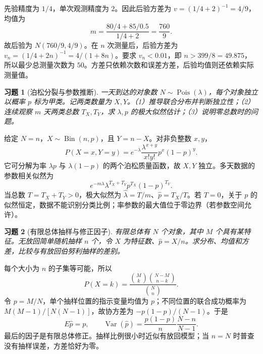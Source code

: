 \documentclass[UTF8,12pt,a4paper,fontset=fandol]{ctexart}
\newtheorem{exercise}{习题}[section]
\begin{document}
\begin{solve}\label{a:M-PF-31}先验精度为 $1/4$，单次观测精度为 $2$。因此后验方差为 $v=(1/4+2)^{-1}=4/9$，均值为\[m=\frac{80/4+85/0.5}{1/4+2}=\frac{760}{9}.\]故后验为 $N(760/9,4/9)$。在 $n$ 次测量后，后验方差为 $v_n=(1/4+2n)^{-1}=4/(1+8n)$。要求 $v_n<0.01$，即 $n>399/8=49.875$，所以最少总测量次数为 $50$。方差只依赖次数和误差方差，后验均值则还依赖实际测量值。\end{solve}

\begin{exercise}[泊松分裂与参数推断]\label{q:B17.1}
一天到达的对象数 $N\sim\operatorname{Pois}(\lambda)$，每个对象独立以概率 $p$ 标为甲类。记两类数量为 $X,Y$。（1）推导联合分布并判断独立性；（2）连续观察 $m$ 天两类总数 $T_X,T_Y$，求 $\lambda,p$ 的极大似然估计；（3）说明零总数时的问题。\par{}
\end{exercise}

\begin{solve}\label{a:B17.1}给定 $N=n$，$X\sim\operatorname{Bin}(n,p)$，且 $Y=n-X$。对非负整数 $x,y$，\[P(X=x,Y=y)=e^{-\lambda}\frac{\lambda^{x+y}}{x!y!}p^x(1-p)^y.\]它可分解为率 $\lambda p$ 与 $\lambda(1-p)$ 的两个泊松质量函数，故 $X,Y$ 独立。多天数据的参数相关似然为\[e^{-m\lambda}\lambda^{T_X+T_Y}p^{T_X}(1-p)^{T_Y}.\]当总数 $T=T_X+T_Y>0$，极大似然为 $\widehat\lambda=T/m$、$\widehat p=T_X/T$。若 $T=0$，关于 $p$ 的似然恒定，数据不能识别分类比例；率参数的最大值位于零边界（若参数空间允许）。\end{solve}

\begin{exercise}[有限总体抽样与修正因子]\label{q:B17.2}
有限总体有 $N$ 个对象，其中 $M$ 个具有某特征。无放回简单随机抽样 $n$ 个，令 $X$ 为特征数、$\widehat p=X/n$。求分布、均值和方差，比较与有放回伯努利抽样的差别。\par{}
\end{exercise}

\begin{solve}\label{a:B17.2}每个大小为 $n$ 的子集等可能，所以\[P(X=k)=\frac{\binom Mk\binom{N-M}{n-k}}{\binom Nn}.\]令 $p=M/N$，单个抽样位置的指示变量均值为 $p$；不同位置的联合成功概率为 $M(M-1)/[N(N-1)]$，故协方差为 $-p(1-p)/(N-1)$。于是\[E\widehat p=p,\qquad\operatorname{Var}(\widehat p)=\frac{p(1-p)}n\frac{N-n}{N-1}.\]最后的因子是有限总体修正。抽样比例很小时近似有放回模型；当 $n=N$ 时普查没有抽样误差，方差恰好为零。\end{solve}
\end{document}
